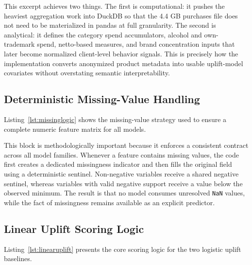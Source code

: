 \documentclass[11pt,a4paper]{article}
\begin{document}


This excerpt achieves two things. The first is computational: it pushes the heaviest aggregation work into DuckDB so that the 4.4 GB purchases file does not need to be materialized in pandas at full granularity. The second is analytical: it defines the category spend accumulators, alcohol and own-trademark spend, netto-based measures, and brand concentration inputs that later become normalized client-level behavior signals. This is precisely how the implementation converts anonymized product metadata into usable uplift-model covariates without overstating semantic interpretability.

\subsection{Deterministic Missing-Value Handling}
Listing~\ref{lst:missinglogic} shows the missing-value strategy used to ensure a complete numeric feature matrix for all models.



This block is methodologically important because it enforces a consistent contract across all model families. Whenever a feature contains missing values, the code first creates a dedicated missingness indicator and then fills the original field using a deterministic sentinel. Non-negative variables receive a shared negative sentinel, whereas variables with valid negative support receive a value below the observed minimum. The result is that no model consumes unresolved \texttt{NaN} values, while the fact of missingness remains available as an explicit predictor.

\subsection{Linear Uplift Scoring Logic}
Listing~\ref{lst:linearuplift} presents the core scoring logic for the two logistic uplift baselines.


\end{document}
